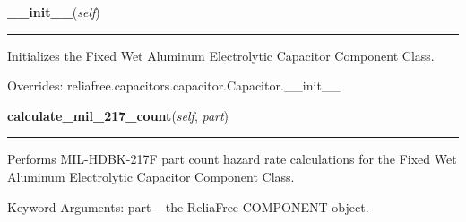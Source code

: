 \hspace{.8\funcindent}\begin{boxedminipage}{\funcwidth}

    \raggedright \textbf{\_\_init\_\_}(\textit{self})

    \vspace{-1.5ex}

    \rule{\textwidth}{0.5\fboxrule}
\setlength{\parskip}{2ex}
    Initializes the Fixed Wet Aluminum Electrolytic Capacitor Component 
    Class.

\setlength{\parskip}{1ex}
      Overrides: reliafree.capacitors.capacitor.Capacitor.\_\_init\_\_

    \end{boxedminipage}

    \label{reliafree:capacitors:electrolytic:Aluminum:calculate_mil_217_count}

    \vspace{0.5ex}

\hspace{.8\funcindent}\begin{boxedminipage}{\funcwidth}

    \raggedright \textbf{calculate\_mil\_217\_count}(\textit{self}, \textit{part})

    \vspace{-1.5ex}

    \rule{\textwidth}{0.5\fboxrule}
\setlength{\parskip}{2ex}
    Performs MIL-HDBK-217F part count hazard rate calculations for the 
    Fixed Wet Aluminum Electrolytic Capacitor Component Class.

    Keyword Arguments: part -- the ReliaFree COMPONENT object.

\setlength{\parskip}{1ex}
    \end{boxedminipage}

    \label{reliafree:capacitors:electrolytic:Aluminum:calculate_mil_217_stress}

    \vspace{0.5ex}

